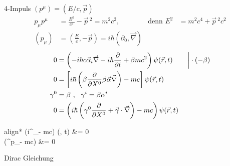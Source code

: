 4-Impuls $(p^\mu) = (E/c, \vec{p})$
	\begin{align*}
		p_\mu p^\mu &= \frac{E^2}{c^2} - \vec{p}\,^2 = m^2 c^2,&
		\text{denn } E^2 &= m^2 c^4 + \vec{p}\,^2 c^2 \\
		(p_\mu) &= \left(\frac{E}{c}, -\vec{p}\right) = i\hbar (\partial_0, \vec{\nabla})
	\end{align*}
	\begin{align*}
		0 &= \left(
			-i \hbar c \vec{\alpha}_i \vec{\nabla} - i\hbar \frac{\partial}{\partial t}
			+ \beta m c^2
		\right) \psi(\vec{r}, t) & 
		&\left.\vphantom{\left(\frac{\partial}{\partial t}\right)}\right| \cdot (-\beta) \\
		0 &= \left[
			i \hbar \left(\beta \frac{\partial}{\partial X^0} \beta \vec{\alpha} \vec{\nabla}\right)
			- mc
		\right] \psi (\vec{r}, t) \\
		\gamma^0 &= \beta ~,~~ \gamma^i =\beta \alpha^i \\
		0 &= \left(i \hbar 
			\left(\gamma^0 \frac{\partial}{\partial X^0} + \vec{\gamma} \cdot \vec{\nabla}\right)
			- mc
		\right) \psi (\vec{r}, t) 
	\end{align*}
	\begin{empheq}[box = \boxed]{align*}
		(i\hbar \gamma^\mu \partial_\mu - mc) \psi(, t) &= 0 \\
		 (\gamma^\mu p_\mu - mc) \ket{\psi} &= 0
	\end{empheq}
Dirac Gleichung
	
